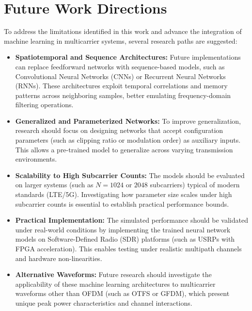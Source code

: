 \section{Future Work Directions}
\label{sec:future_work}

To address the limitations identified in this work and advance the integration of machine learning in multicarrier systems, several research paths are suggested:

\begin{itemize}
    \item \textbf{Spatiotemporal and Sequence Architectures:} Future implementations can replace feedforward networks with sequence-based models, such as Convolutional Neural Networks (CNNs) or Recurrent Neural Networks (RNNs). These architectures exploit temporal correlations and memory patterns across neighboring samples, better emulating frequency-domain filtering operations.
    \item \textbf{Generalized and Parameterized Networks:} To improve generalization, research should focus on designing networks that accept configuration parameters (such as clipping ratio or modulation order) as auxiliary inputs. This allows a pre-trained model to generalize across varying transmission environments.
    \item \textbf{Scalability to High Subcarrier Counts:} The models should be evaluated on larger systems (such as $N = 1024$ or $2048$ subcarriers) typical of modern standards (LTE/5G). Investigating how parameter size scales under high subcarrier counts is essential to establish practical performance bounds.
    \item \textbf{Practical Implementation:} The simulated performance should be validated under real-world conditions by implementing the trained neural network models on Software-Defined Radio (SDR) platforms (such as USRPs with FPGA acceleration). This enables testing under realistic multipath channels and hardware non-linearities.
    \item \textbf{Alternative Waveforms:} Future research should investigate the applicability of these machine learning architectures to multicarrier waveforms other than OFDM (such as OTFS or GFDM), which present unique peak power characteristics and channel interactions.
\end{itemize}
